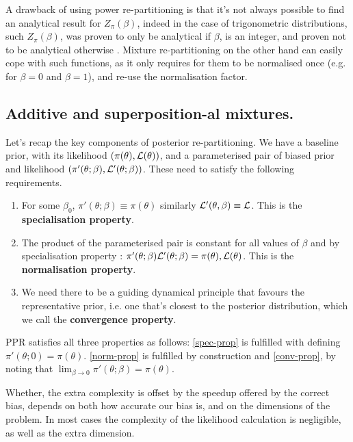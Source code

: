 \documentclass[usenatbib]{mnras}
\begin{document}
A drawback of using power re-partitioning is that it's not always
possible to find an analytical result for \(Z_{\pi}(\beta)\), indeed
in the case of trigonometric distributions, such \(Z_{\pi}(\beta)\),
was proven to only be analytical if \(\beta\), is an integer, and
proven not to be analytical otherwise \citep{Liouville1837}. Mixture
re-partitioning on the other hand can easily cope with such
functions, as it only requires for them to be normalised once
(e.g. for \(\beta=0\) and \(\beta=1\)), and re-use the normalisation
factor.

\subsection{Additive and superposition-al mixtures.}
\label{sec:org10638f9}

Let's recap the key components of posterior re-partitioning. We have
   a baseline prior, with its likelihood \((\pi(\theta), \cal L
      (\theta))\), and a parameterised pair of biased prior and
   likelihood \((\pi'(\theta; \beta), \cal L' (\theta;
      \beta))\). These need to satisfy the following requirements.

\begin{enumerate}
\item For some \(\beta_{0}\), \(\pi'(\theta; \beta) \equiv \pi(\theta)\)
similarly \({\cal L'(\theta, \beta) \equiv {\cal L}}\). This is
the \textbf{\textbf{specialisation property}}.\label{spec-prop}
\item The product of the parameterised pair is constant for all values
of \(\beta\) and by specialisation property : \(\pi'(\theta; \beta)
      \cal L' (\theta; \beta) = \pi(\theta), \cal L (\theta)\). This is
the \textbf{\textbf{normalisation property}}.\label{norm-prop}
\item We need there to be a guiding dynamical principle that favours
the representative prior, i.e. one that's closest to the
posterior distribution, which we call the \textbf{\textbf{convergence
property}}.\label{conv-prop}
\end{enumerate}

PPR satisfies all three properties as follows: \ref{spec-prop} is
fulfilled with defining \(\pi'(\theta; 0) =
   \pi(\theta)\). \ref{norm-prop} is fulfilled by construction and
\ref{conv-prop},  by noting that \(\lim_{\beta
   \rightarrow 0} \pi'(\theta; \beta) = \pi(\theta)\).

Whether, the extra complexity is offset by the speedup offered by
the correct bias, depends on both how accurate our bias is, and on
the dimensions of the problem. In most cases the complexity of the
likelihood calculation is negligible, as well as the extra
dimension.
\end{document}
